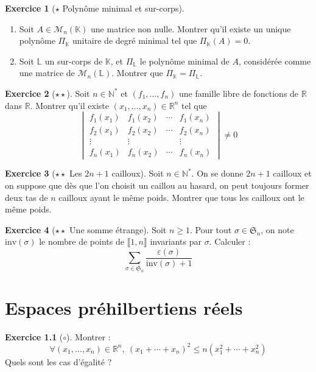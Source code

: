\documentclass[french]{book}
\newcommand{\N}{\mathbb{N}}
\newcommand{\R}{\mathbb{R}}
\newcommand{\K}{\mathbb{K}}
\renewcommand{\L}{\mathbb{L}}
\newcommand{\st}{^*}
\theoremstyle{definition}
\newtheorem{ex}{Exercice}[chapter]
\theoremstyle{theorem}
\theoremstyle{remark}
\begin{document}
\begin{ex}[$\star$ Polynôme minimal et sur-corps]
	\begin{enumerate}
		\item Soit $A\in\mathcal{M}_n(\K)$ une matrice non nulle. Montrer qu'il existe un unique polynôme $\Pi_\K$ unitaire de degré minimal tel que $\Pi_\K(A)=0$.
		\item Soit $\L$ un sur-corps de $\K$, et $\Pi_\L$ le polynôme minimal de $A$, considérée comme une matrice de $\mathcal{M}_n(\L)$. Montrer que $\Pi_\K=\Pi_\L$.
	\end{enumerate}
\end{ex}

\begin{ex}[$\star\star$]
	Soit $n\in\N\st$ et $(f_1,\ldots,f_n)$ une famille libre de fonctions de $\R$ dans $\R$. Montrer qu'il existe $(x_1,\ldots,x_n)\in\R^n$ tel que $$\begin{vmatrix}
		f_1(x_1)&f_1(x_2)&\cdots&f_1(x_n)\\
		f_2(x_1)&f_2(x_2)&\cdots&f_2(x_n)\\
		\vdots&\vdots&&\vdots\\
		f_n(x_1)&f_n(x_2)&\cdots&f_n(x_n)
	\end{vmatrix}\ne 0$$
\end{ex}

\begin{ex}[$\star\star$ Les $2n+1$ cailloux]
	Soit $n\in\N\st$. On se donne $2n+1$ cailloux et on suppose que dès que l'on choisit un caillou au hasard, on peut toujours former deux tas de $n$ cailloux ayant le même poids. Montrer que tous les cailloux ont le même poids.
\end{ex}

\begin{ex}[$\star\star$ Une somme étrange]
	Soit $n\geqslant1$. Pour tout $\sigma\in\mathfrak{S}_n$, on note $\text{inv}(\sigma)$ le nombre de points de $\llbracket1,n\rrbracket$ invariants par $\sigma$. Calculer : $$\sum_{\sigma\in\mathfrak{S}_n}\frac{\varepsilon(\sigma)}{\text{inv}(\sigma)+1}$$
\end{ex}

\chapter{Espaces préhilbertiens réels}

\begin{ex}[$\circ$]
	Montrer : $$\forall (x_1,\ldots,x_n)\in\R^n,\ \left(x_1+\cdots+x_n\right)^2\leqslant n(x_1^2+\cdots+x_n^2)$$ Quels sont les cas d'égalité ?
\end{ex}
\end{document}
